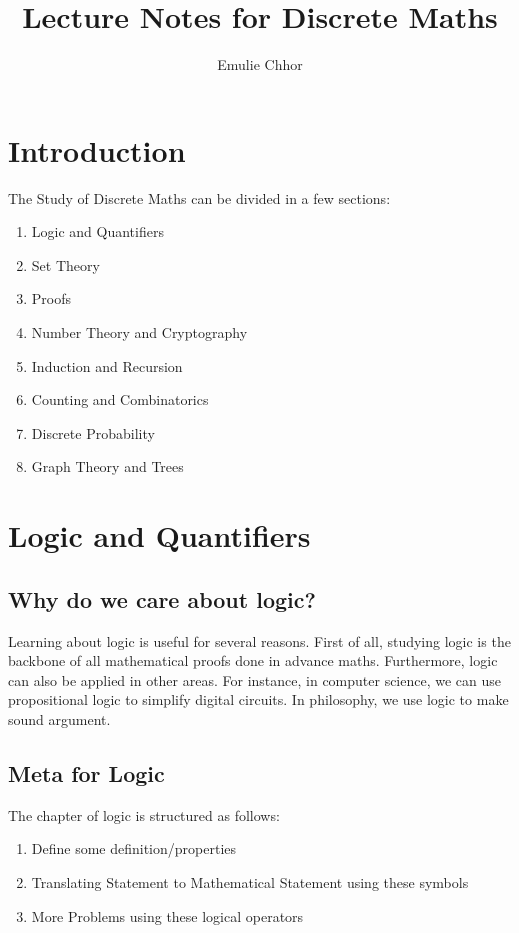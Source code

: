 \documentclass{article}
\begin{document}
\title{Lecture Notes for Discrete Maths}
\author{Emulie Chhor}
\maketitle
\section{Introduction}

The Study of Discrete Maths can be divided in a few sections:\\

    \begin{enumerate}
	\item Logic and Quantifiers
	\item Set Theory
	\item Proofs
	\item Number Theory and Cryptography
	\item Induction and Recursion
	\item Counting and Combinatorics
	\item Discrete Probability
	\item Graph Theory and Trees
    \end{enumerate}

\section{Logic and Quantifiers}

\subsection{Why do we care about logic?}

Learning about logic is useful for several reasons. First of all, studying logic
is the backbone of all mathematical proofs done in advance maths. Furthermore,
logic can also be applied in other areas. For instance, in computer science, we
can use propositional logic to simplify digital circuits. In philosophy, we use
logic to make sound argument.

\subsection{Meta for Logic}

The chapter of logic is structured as follows:

    \begin{enumerate}
	\item Define some definition/properties
	\item Translating Statement to Mathematical Statement using these symbols
	\item More Problems using these logical operators
    \end{enumerate}
\end{document}
